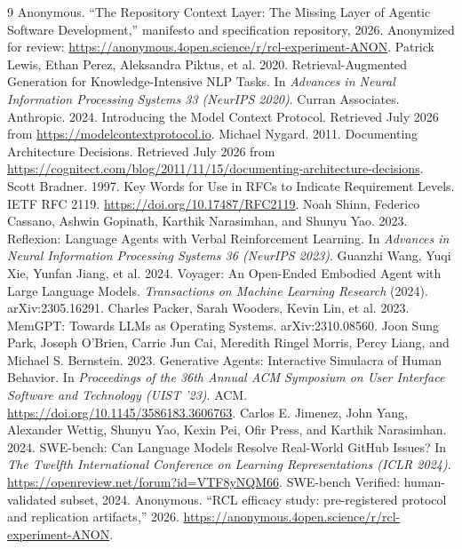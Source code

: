 \documentclass[sigconf,review,anonymous]{acmart}
\newcommand{\artifact}{\url{https://anonymous.4open.science/r/rcl-experiment-ANON}}
\begin{document}
\begin{thebibliography}{9}
 Anonymous. ``The Repository Context Layer: The Missing Layer of Agentic Software Development,'' manifesto and specification repository, 2026. Anonymized for review: \artifact.
 Patrick Lewis, Ethan Perez, Aleksandra Piktus, et al. 2020. Retrieval-Augmented Generation for Knowledge-Intensive NLP Tasks. In \emph{Advances in Neural Information Processing Systems 33 (NeurIPS 2020)}. Curran Associates.
 Anthropic. 2024. Introducing the Model Context Protocol. Retrieved July 2026 from \url{https://modelcontextprotocol.io}.
 Michael Nygard. 2011. Documenting Architecture Decisions. Retrieved July 2026 from \url{https://cognitect.com/blog/2011/11/15/documenting-architecture-decisions}.
 Scott Bradner. 1997. Key Words for Use in RFCs to Indicate Requirement Levels. IETF RFC 2119. \url{https://doi.org/10.17487/RFC2119}.
 Noah Shinn, Federico Cassano, Ashwin Gopinath, Karthik Narasimhan, and Shunyu Yao. 2023. Reflexion: Language Agents with Verbal Reinforcement Learning. In \emph{Advances in Neural Information Processing Systems 36 (NeurIPS 2023)}.
 Guanzhi Wang, Yuqi Xie, Yunfan Jiang, et al. 2024. Voyager: An Open-Ended Embodied Agent with Large Language Models. \emph{Transactions on Machine Learning Research} (2024). arXiv:2305.16291.
 Charles Packer, Sarah Wooders, Kevin Lin, et al. 2023. MemGPT: Towards LLMs as Operating Systems. arXiv:2310.08560.
 Joon Sung Park, Joseph O'Brien, Carrie Jun Cai, Meredith Ringel Morris, Percy Liang, and Michael S. Bernstein. 2023. Generative Agents: Interactive Simulacra of Human Behavior. In \emph{Proceedings of the 36th Annual ACM Symposium on User Interface Software and Technology (UIST '23)}. ACM. \url{https://doi.org/10.1145/3586183.3606763}.
 Carlos E. Jimenez, John Yang, Alexander Wettig, Shunyu Yao, Kexin Pei, Ofir Press, and Karthik Narasimhan. 2024. SWE-bench: Can Language Models Resolve Real-World GitHub Issues? In \emph{The Twelfth International Conference on Learning Representations (ICLR 2024)}. \url{https://openreview.net/forum?id=VTF8yNQM66}. SWE-bench Verified: human-validated subset, 2024.
 Anonymous. ``RCL efficacy study: pre-registered protocol and replication artifacts,'' 2026. \artifact.
\end{thebibliography}
\end{document}
